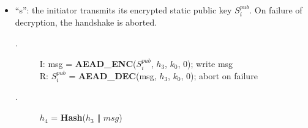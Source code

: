 \begin{enumerate} [start = \value{msg}]
\begin{itemize}
    \item ``s'':  the initiator transmits its encrypted static public key $S^{pub}_i$. On failure of
    decryption, the handshake is aborted.
      \begin{center}
        \begin{varwidth}{\textwidth}
          \begin{description}
          \item[\textnormal{}.] 
                I: msg = \textbf{AEAD{\_}ENC}($S^{pub}_i$, $h_3$, $k_0$, 0); write msg \\
                R: $S^{pub}_i$ = \textbf{AEAD{\_}DEC}(msg, $h_3$, $k_0$, 0); abort on failure
          \addtocounter{cnt}{1}
          \item[\textnormal{}.] $h_4$ = \textbf{Hash}($h_3$ $\Vert$ $msg$)
          \addtocounter{cnt}{1}
          \end{description}
        \end{varwidth}
      \end{center}


\end{itemize}
\end{enumerate}
